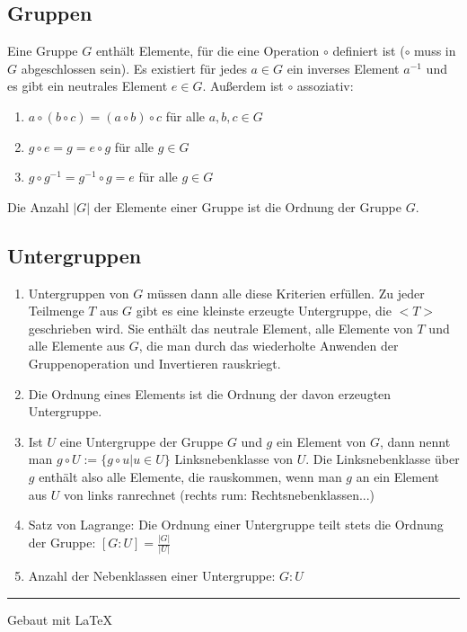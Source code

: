 \documentclass[12pt,landscape]{article}
\begin{document}
\begin{multicols}{3}
\subsection{Gruppen}
Eine Gruppe $G$ enthält Elemente, für die eine Operation $\circ$ definiert ist ($\circ$ muss in $G$ abgeschlossen sein). Es existiert für jedes $a \in G$ ein inverses Element $a^{-1}$ und es gibt ein neutrales Element $e \in G$. Außerdem ist $\circ$ assoziativ:
\begin{enumerate}
\item $a \circ (b \circ c) = (a \circ b) \circ c$ für alle $a, b, c \in G$
\item $g \circ e = g = e \circ g$ für alle $g \in G$
\item $g \circ g^{-1} = g^{-1} \circ g = e$ für alle $g \in G$
\end{enumerate}
Die Anzahl $|G|$ der Elemente einer Gruppe ist die Ordnung der Gruppe $G$.
\subsection{Untergruppen}
\begin{enumerate}
\item Untergruppen von $G$ müssen dann alle diese Kriterien erfüllen. Zu jeder Teilmenge $T$ aus $G$ gibt es eine kleinste erzeugte Untergruppe, die $<T>$ geschrieben wird. Sie enthält das neutrale Element, alle Elemente von $T$ und alle Elemente aus $G$, die man durch das wiederholte Anwenden der Gruppenoperation und Invertieren rauskriegt.
\item Die Ordnung eines Elements ist die Ordnung der davon erzeugten Untergruppe.
\item Ist $U$ eine Untergruppe der Gruppe $G$ und $g$ ein Element von $G$, dann nennt man $g \circ U := \{g \circ u | u \in U\}$ Linksnebenklasse von $U$. Die Linksnebenklasse über $g$ enthält also alle Elemente, die rauskommen, wenn man $g$ an ein Element aus $U$ von links ranrechnet (rechts rum: Rechtsnebenklassen...)
\item Satz von Lagrange: Die Ordnung einer Untergruppe teilt stets die Ordnung der Gruppe: $[G : U] = \frac{|G|}{|U|}$
\item Anzahl der Nebenklassen einer Untergruppe: $G : U$
\end{enumerate}
\rule{0.3\linewidth}{0.25pt}
\scriptsize

Gebaut mit \LaTeX
\end{multicols}
\end{document}
